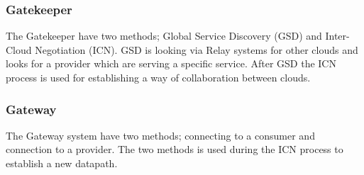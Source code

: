 \subsubsection{Gatekeeper}
The Gatekeeper have two methods; Global Service Discovery (GSD) and Inter-Cloud Negotiation (ICN).
GSD is looking via Relay systems for other clouds and looks for a provider which are serving a specific service.
After GSD the ICN process is used for establishing a way of collaboration between clouds.

\subsubsection{Gateway}
The Gateway system have two methods; connecting to a consumer and connection to a provider.
The two methods is used during the ICN process to establish a new datapath.